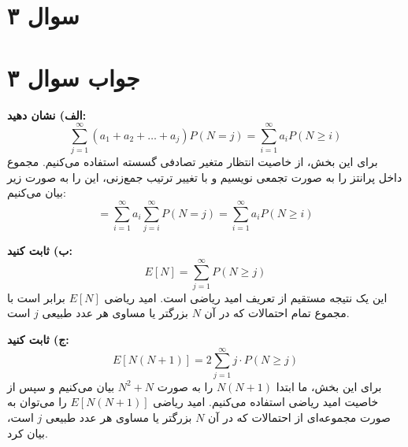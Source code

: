 \section*{سوال ۳}



\section*{جواب سوال ۳}

\textbf{الف) نشان دهید:} 
\[ \sum_{j=1}^{\infty} (a_1 + a_2 + \ldots + a_j) P(N = j) = \sum_{i=1}^{\infty} a_i P(N \geq i) \]
برای این بخش، از خاصیت انتظار متغیر تصادفی گسسته استفاده می‌کنیم. مجموع داخل پرانتز را به صورت تجمعی نویسیم و با تغییر ترتیب جمع‌زنی، این را به صورت زیر بیان می‌کنیم:
\[ = \sum_{i=1}^{\infty} a_i \sum_{j=i}^{\infty} P(N = j) = \sum_{i=1}^{\infty} a_i P(N \geq i) \]

\textbf{ب) ثابت کنید:} 
\[ E[N] = \sum_{j=1}^{\infty} P(N \geq j) \]
این یک نتیجه مستقیم از تعریف امید ریاضی است. امید ریاضی \( E[N] \) برابر است با مجموع تمام احتمالات که در آن \( N \) بزرگتر یا مساوی هر عدد طبیعی \( j \) است.

\textbf{ج) ثابت کنید:} 
\[ E[N(N + 1)] = 2 \sum_{j=1}^{\infty} j \cdot P(N \geq j) \]
برای این بخش، ما ابتدا \( N(N + 1) \) را به صورت \( N^2 + N \) بیان می‌کنیم و سپس از خاصیت امید ریاضی استفاده می‌کنیم. امید ریاضی \( E[N(N + 1)] \) را می‌توان به صورت مجموعه‌ای از احتمالات که در آن \( N \) بزرگتر یا مساوی هر عدد طبیعی \( j \) است، بیان کرد.